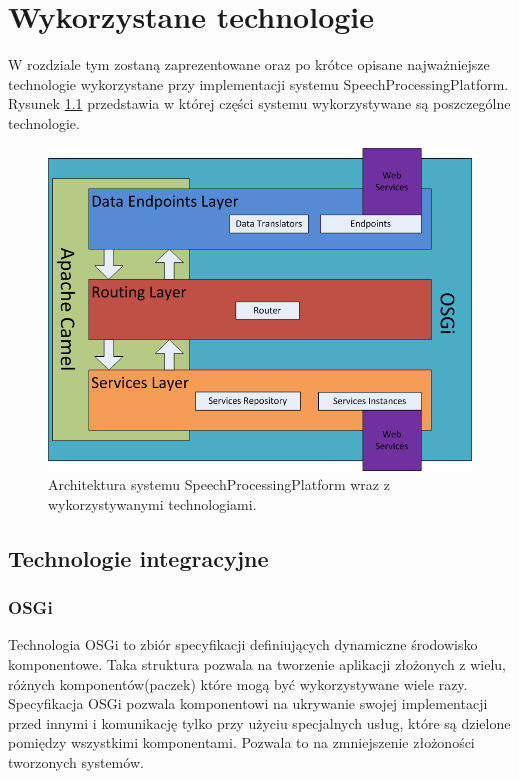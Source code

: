 \ifpdf
    \graphicspath{{3/figures/PNG/}{3/figures/PDF/}{3/figures/}}
\else
    \graphicspath{{3/figures/EPS/}{3/figures/}}
\fi
\chapter{Wykorzystane technologie} %


W rozdziale tym zostaną zaprezentowane oraz po krótce opisane najważniejsze technologie wykorzystane przy implementacji systemu SpeechProcessingPlatform. Rysunek \ref{fig:architecture_and_technologies} przedstawia w której części systemu wykorzystywane są poszczególne technologie.

\begin{figure}[!h]
	\centering
	\includegraphics[scale=0.45]{layered_architecture_and_technologies.png} 
	\caption{Architektura systemu SpeechProcessingPlatform wraz z wykorzystywanymi technologiami.}
\label{fig:architecture_and_technologies}
\end{figure}

\section{Technologie integracyjne}
\subsection{OSGi}
Technologia OSGi to zbiór specyfikacji definiujących dynamiczne środowisko komponentowe. Taka struktura pozwala na tworzenie aplikacji złożonych z wielu, różnych komponentów(paczek) które mogą być wykorzystywane wiele razy. Specyfikacja OSGi pozwala komponentowi na ukrywanie swojej implementacji przed innymi i komunikację tylko przy użyciu specjalnych usług, które są dzielone pomiędzy wszystkimi komponentami. Pozwala to na zmniejszenie złożoności tworzonych systemów.

